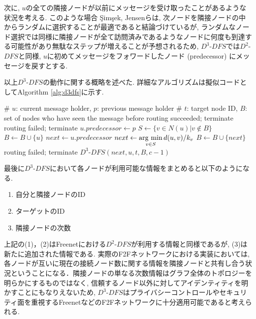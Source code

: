 \documentclass[technicalreport]{./ieicej-v3.0/UTF/ieicej}
\newcommand{\argmin}{\mathop{\rm arg~min}\limits}
\begin{document}
次に, $u$の全ての隣接ノードが以前にメッセージを受け取ったことがあるような状況を考える. このような場合 {\c{S}}im{\c{s}}ek, Jensenらは, 次ノードを隣接ノードの中からランダムに選択することが最適であると結論づけているが, ランダムなノード選択では同様に隣接ノードが全て訪問済みであるようなノードに何度も到達する可能性があり無駄なステップが増えることが予想されるため, $D^3$-$DFS$では$D^2$-$DFS$と同様, $u$に初めてメッセージをフォワードしたノード (predecessor) にメッセージを戻すとする.

以上$D^3$-$DFS$の動作に関する概略を述べた. 詳細なアルゴリズムは擬似コードとしてAlgorithm \ref{alg:d3dfs}に示す. 
   \begin{algorithm}[htb]
    \caption{$D^3$-$DFS(\textrm{Node } u,\textrm{ Node } p, \textrm{ ID } t,\textrm{ Set }B, \textrm{ TTL }c$)}\label{alg:d3dfs}
    \begin{algorithmic}[1]
     \State \# $u$: current message holder, $p$: previous message holder
     \State \# $t$: target node ID, $B$: set of nodes who have seen the message before
     \State \textrm{routing succeeded; terminate}
     \EndIf
     \State \textrm{routing failed; terminate}
     \EndIf
     \State $u.predecessor \gets p$
     \EndIf
     \State $S \gets \{v \in N(u) |  v \notin B \}$
     \State $B \gets B \cup \{u\}$
     \State $next \gets u.predecessor$
     \Else
     \State $next \gets \argmin_{v \in S} d(u, v)/k_v$
     \State $B \gets B \cup \{ next\}$
     \EndIf
     \State \textrm{routing failed; terminate}
     \Else
     \State $D^3$-$DFS(next, u, t, B, c-1)$
     \EndIf
    \end{algorithmic}
   \end{algorithm}
   
最後に$D^3$-$DFS$において各ノードが利用可能な情報をまとめると以下のようになる.

   \begin{enumerate}
    \item 自分と隣接ノードのID

    \item ターゲットのID

    \item 隣接ノードの次数
   \end{enumerate}

上記の(1)，(2)はFreenetにおける$D^2$-$DFS$が利用する情報と同様であるが, (3)は新たに追加された情報である. 実際のF2Fネットワークにおける実装においては, 各ノードが互いに現在の接続ノード数に関する情報を隣接ノードと共有し合う状況ということになる．隣接ノードの単なる次数情報はグラフ全体のトポロジーを明らかにするものではなく, 信頼するノード以外に対してアイデンティティを明かすことにもなりえないため, $D^3$-$DFS$はプライバシーコントロールやセキュリティ面を重視するFreenetなどのF2Fネットワークに十分適用可能であると考えられる.
\end{document}
